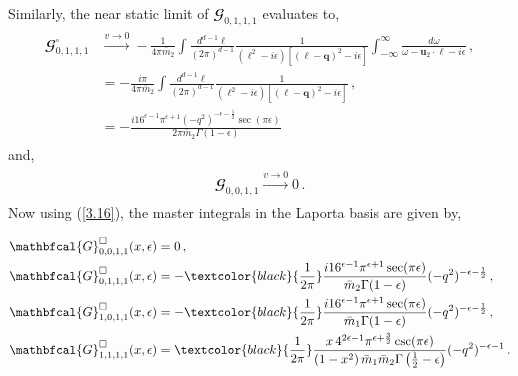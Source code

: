 Similarly, the near static limit of  $\mathbfcal{G}_{0,1,1,1}$ evaluates to,
\begin{align}
    \begin{split}
        \mathbfcal{G}^{\square}_{0,1,1,1}&\xrightarrow[]{v\to 0}-\frac{1}{4\pi\bar m_2}\int \frac{d^{d-1}\ell}{(2\pi)^{d-1}} \frac{1}{(\boldsymbol{\ell}^2-i\epsilon)[(\boldsymbol{\ell-\boldsymbol{q}})^2-i\epsilon]}\int_{-\infty}^{\infty}  \frac{d\omega}{\omega-\boldsymbol{u}_2\cdot \boldsymbol{\ell}-i\epsilon}\,,\\ &
        =-\frac{i\pi}{4\pi\bar m_2}\int 
    \frac{d^{d-1}\boldsymbol{\ell}}{(2\pi)^{d-1}}\frac{1}{(\boldsymbol{\ell}^2-i\epsilon)[(\boldsymbol{\ell-\boldsymbol{q}})^2-i\epsilon]}\,,\\ &
        =-\frac{i 16^{\epsilon -1} \pi ^{\epsilon +1} \left(-q^2\right)^{-\epsilon -\frac{1}{2}} \sec (\pi  \epsilon )}{2\pi\bar{m}_2 \Gamma (1-\epsilon )}
    \end{split}
\end{align}
and,
\begin{align}
    \begin{split}
        \mathbfcal{G}_{0,0,1,1}\xrightarrow[]{v\to 0}0\,.
    \end{split}
\end{align}
Now using (\ref{3.16}), the master integrals in the Laporta basis are given by,

\begin{center}
\begin{tcolorbox}[thesisresultbox, title=\textit{Master Integrals for box topologies}]
\restorethesisbodyformat

\begin{align}
    \begin{split}
     \hspace{0 cm}    &\mathbfcal{G}^{\square}_{0,0,1,1}(x,\epsilon)=0\,,\\&
        \mathbfcal{G}^{\square}_{0,1,1,1}(x,\epsilon)=- \textcolor{black}{\frac{1}{2 \pi}} \frac{i 16^{\epsilon -1} \pi ^{\epsilon +1} \sec (\pi  \epsilon )}{\bar{m}_2 \Gamma (1-\epsilon )}(-q^2)^{-\epsilon-\frac{1}{2}}\,,\\ &
        \mathbfcal{G}^{\square}_{1,0,1,1}(x,\epsilon)=- \textcolor{black}{\frac{1}{2 \pi}} \frac{i 16^{\epsilon -1} \pi ^{\epsilon +1} \sec (\pi  \epsilon )}{\bar{m}_1 \Gamma (1-\epsilon )}(-q^2)^{-\epsilon-\frac{1}{2}}\,,
        \\ &\mathbfcal{G}^{\square}_{1,1,1,1}(x,\epsilon)= \textcolor{black}{\frac{1}{2 \pi}} \frac{x\, 4^{2 \epsilon -1} \pi ^{\epsilon +\frac{3}{2}} \csc (\pi  \epsilon )}{\left(1-x^2\right) \bar{m}_1 \bar{m}_2 \Gamma \left(\frac{1}{2}-\epsilon \right)}(-q^2)^{-\epsilon-1}\,. 
    \end{split}
\end{align}
\end{tcolorbox}
\restorethesisbodyformat
\end{center}
